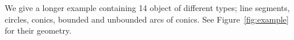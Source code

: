 We give a longer example containing 14 object of different types; line
segments, circles, conics, bounded and unbounded arcs of conics. See
Figure~\ref{fig:example} for their geometry.


